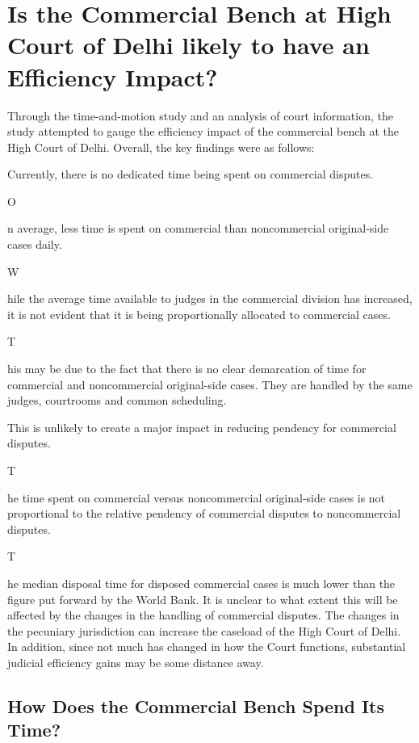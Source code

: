 \documentclass[a4paper, 12pt, twoside]{article}
\begin{document}
\section{Is the Commercial Bench at High Court of Delhi likely to have an Efficiency Impact?}\label{sec:3}

Through the time-and-motion study and an analysis of court information, the study attempted to gauge the efficiency impact of the commercial bench at the High Court of Delhi. Overall, the key findings were as follows:

\begin{enumerate}
\item Currently, there is no dedicated time being spent on commercial disputes.
\newcommand{\SubItem}[1]{{\setlength\itemindent{15pt} \item[–] #1}}
\SubItem On average, less time is spent on commercial than noncommercial original-side cases daily.
\SubItem While the average time available to judges in the commercial division has increased, it is not evident that it is being proportionally allocated to commercial cases.
\SubItem This may be due to the fact that there is no clear demarcation of time for commercial and noncommercial original-side cases. They are handled by the same judges, courtrooms and common scheduling. 
\item This is unlikely to create a major impact in reducing pendency for commercial disputes.
\SubItem The time spent on commercial versus noncommercial original-side cases is not proportional to the relative pendency of commercial disputes to noncommercial disputes.
\SubItem The median disposal time for disposed commercial cases is much lower than the figure put forward by the World Bank. It is unclear to what extent this will be affected by the changes in the handling of commercial disputes. The changes in the pecuniary jurisdiction can increase the caseload of the High Court of Delhi. In addition, since not much has changed in how the Court functions, substantial judicial efficiency gains may be some distance away.
\end{enumerate}

\subsection{How Does the Commercial Bench Spend Its Time?}
\end{document}
